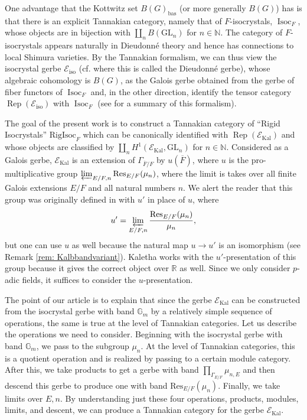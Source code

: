 \documentclass[11pt]{amsart}
\theoremstyle{definition}
\newcommand{\mc}{\mathcal}
\newcommand{\R}{\mathbb{R}}
\newcommand{\ov}{\overline}
\newcommand{\N}{\mathbb{N}}
\newcommand{\Res}{\mathrm{Res}}
\newcommand{\RigIsoc}{\mathrm{RigIsoc}}
\newcommand{\GL}{\mathrm{GL}}
\DeclareMathOperator{\Kal}{Kal}
\DeclareMathOperator{\bas}{bas}
\DeclareMathOperator{\Rep}{Rep}
\DeclareMathOperator{\Isoc}{Isoc}
\newcommand{\Gm}{\mathbb{G}_m}
\begin{document}
One advantage that the Kottwitz set $B(G)_{\bas}$ (or more generally $B(G)$) has is that there is an explicit Tannakian category, namely that of $F$-isocrystals, $\Isoc_F$, whose objects are in bijection with $\coprod_n B(\GL_n)$ for $n \in \N$. The category of $F$-isocrystals appears naturally in Dieudonn\'{e} theory and hence has connections to local Shimura varieties. By the Tannakian formalism, we can thus view the isocrystal gerbe $\mc{E}_{\text{iso}}$ (cf. \cite{LR} where this is called the Dieudonn\'{e} gerbe), whose algebraic cohomology is $B(G)$, as the Galois gerbe obtained from the gerbe of fiber functors of $\Isoc_{F}$ and, in the other direction, identify the tensor category $\Rep(\mc{E}_{\text{iso}})$ with $\Isoc_{F}$ (see \cite[\S 7.1]{Taibi25} for a summary of this formalism). 

The goal of the present work is to construct a Tannakian category of ``Rigid Isocrystals'' $\RigIsoc_{F}$ which can be canonically identified with $\Rep(\mc{E}_{\Kal})$ and whose objects are classified by $\coprod_n H^1(\mc{E}_{\Kal}, \GL_n)$ for $n \in \N$. Considered as a Galois gerbe, $\mc{E}_{\Kal}$ is an extension of $\Gamma_{\ov{F}/F}$ by $u(\ov{F})$, where $u$ is the pro-multiplicative group $\varprojlim_{E/F, n} \Res_{E/F} (\mu_n)$, where the limit is takes over all finite Galois extensions $E/F$ and all natural numbers $n$. We alert the reader that this group was originally defined in \cite{Kalannals} with $u'$ in place of $u$, where
\begin{equation*}
u' = \varprojlim_{E/F,n} \frac{\Res_{E/F} (\mu_n)}{\mu_{n}},
\end{equation*}
but one can use $u$ as well because the natural map $u \to u'$ is an isomorphism (see Remark \ref{rem: Kalbbandvariant}). Kaletha works with the $u'$-presentation of this group because it gives the correct object over $\R$ as well. Since we only consider $p$-adic fields, it suffices to consider the $u$-presentation.

The point of our article is to explain that since the gerbe $\mc{E}_{\Kal}$ can be constructed from the isocrystal gerbe with band $\Gm$ by a relatively simple sequence of operations, the same is true at the level of Tannakian categories. Let us describe the operations we need to consider. Beginning with the isocrystal gerbe with band $\Gm$, we pass to the subgroup $\mu_n$. At the level of Tannakian categories, this is a quotient operation and is realized by passing to a certain module category. After this, we take products to get a gerbe with band $\prod\limits_{\Gamma_{E/F}} \mu_{n,E}$ and then descend this gerbe to produce one with band $\Res_{E/F} (\mu_n)$. Finally, we take limits over $E, n$. By understanding just these four operations, products, modules, limits, and descent, we can produce a Tannakian category for the gerbe $\mc{E}_{\Kal}$.
\end{document}
